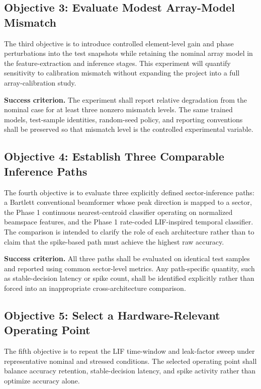 \subsection{Objective 3: Evaluate Modest Array-Model Mismatch}

The third objective is to introduce controlled element-level gain and phase perturbations into the test snapshots while retaining the nominal array model in the feature-extraction and inference stages. This experiment will quantify sensitivity to calibration mismatch without expanding the project into a full array-calibration study.

\textbf{Success criterion.} The experiment shall report relative degradation from the nominal case for at least three nonzero mismatch levels. The same trained models, test-sample identities, random-seed policy, and reporting conventions shall be preserved so that mismatch level is the controlled experimental variable.

\subsection{Objective 4: Establish Three Comparable Inference Paths}

The fourth objective is to evaluate three explicitly defined sector-inference paths: a Bartlett conventional beamformer whose peak direction is mapped to a sector, the Phase 1 continuous nearest-centroid classifier operating on normalized beamspace features, and the Phase 1 rate-coded LIF-inspired temporal classifier. The comparison is intended to clarify the role of each architecture rather than to claim that the spike-based path must achieve the highest raw accuracy.

\textbf{Success criterion.} All three paths shall be evaluated on identical test samples and reported using common sector-level metrics. Any path-specific quantity, such as stable-decision latency or spike count, shall be identified explicitly rather than forced into an inappropriate cross-architecture comparison.

\subsection{Objective 5: Select a Hardware-Relevant Operating Point}

The fifth objective is to repeat the LIF time-window and leak-factor sweep under representative nominal and stressed conditions. The selected operating point shall balance accuracy retention, stable-decision latency, and spike activity rather than optimize accuracy alone.

